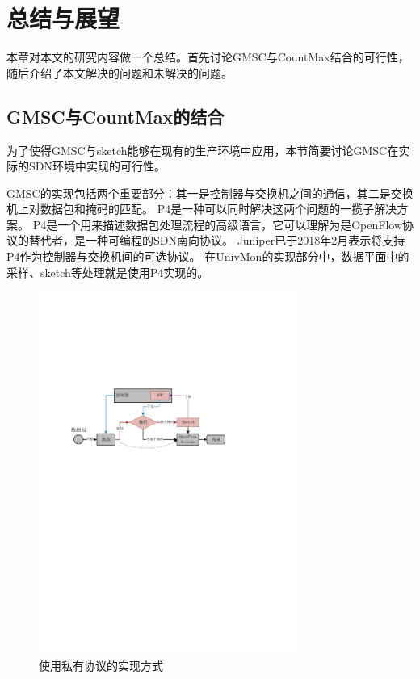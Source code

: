 \chapter{总结与展望}
本章对本文的研究内容做一个总结。首先讨论GMSC与CountMax结合的可行性，随后介绍了本文解决的问题和未解决的问题。

\section{GMSC与CountMax的结合}

为了使得GMSC与sketch能够在现有的生产环境中应用，本节简要讨论GMSC在实际的SDN环境中实现的可行性。

GMSC的实现包括两个重要部分：其一是控制器与交换机之间的通信，其二是交换机上对数据包和掩码的匹配。
P4\cite{bosshart2014p4}是一种可以同时解决这两个问题的一揽子解决方案。
P4是一个用来描述数据包处理流程的高级语言，它可以理解为是OpenFlow协议的替代者，是一种可编程的SDN南向协议。
Juniper已于2018年2月表示将支持P4作为控制器与交换机间的可选协议\cite{juniper2018p4}。
在UnivMon\cite{liu2016one}的实现部分中，数据平面中的采样、sketch等处理就是使用P4实现的。

\begin{figure}[ht]
	\centering
	\includegraphics[width=0.75\textwidth]{fig/private.pdf}
	\caption{使用私有协议的实现方式}
	\label{fig:private}
\end{figure}

